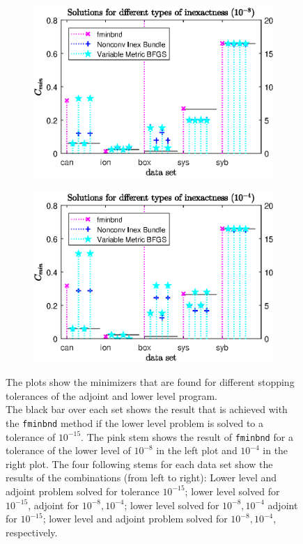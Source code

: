 \begin{figure}[ht]
	\begin{subfigure}{0.49\textwidth}
		\includegraphics[width=\textwidth]{Pictures/Plots/Scal100_llad-8C.eps}%
	\end{subfigure}%
	\hfill
	\begin{subfigure}{0.49\textwidth}
		\includegraphics[width=\textwidth]{Pictures/Plots/Scal100_llad-4C.eps}%
	\end{subfigure}
	\caption[Minimizers for different stopping tolerances of the lower level and adjoint program]{The plots show the minimizers that are found for different stopping tolerances of the adjoint and lower level program.\\
	The black bar over each set shows the result that is achieved with the \textup{\texttt{fminbnd}} method if the lower level problem is solved to a tolerance of \(10^{-15}\). The pink stem shows the result of \textup{\texttt{fminbnd}} for a tolerance of the lower level of \(10^{-8}\) in the left plot and \(10^{-4}\) in the right plot. The four following stems for each data set show the results of the combinations (from left to right): Lower level and adjoint problem solved for tolerance \(10^{-15}\); lower level solved for \(10^{-15}\), adjoint for \(10^{-8}, 10^{-4}\); lower level solved for \(10^{-8},10^{-4}\) adjoint for \(10^{-15}\); lower level and adjoint problem solved for \(10^{-8},10^{-4}\), respectively.\\
}
\end{figure}
